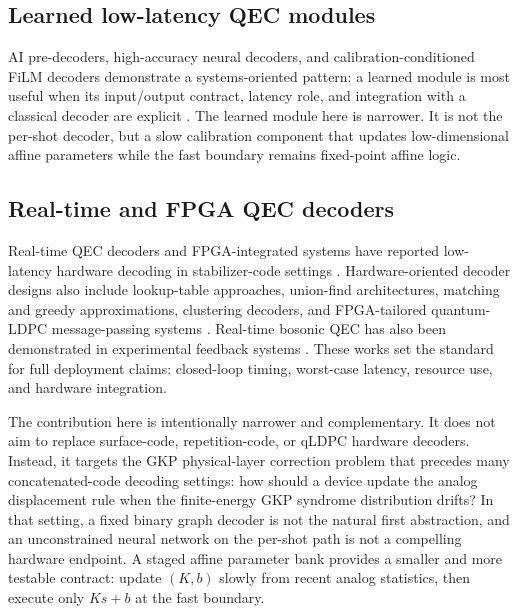 \documentclass[11pt]{article}
\begin{document}
\subsection{Learned low-latency QEC modules}

AI pre-decoders, high-accuracy neural decoders, and calibration-conditioned
FiLM decoders demonstrate a systems-oriented pattern: a learned module is most
useful when its input/output contract, latency role, and integration with a
classical decoder are explicit \cite{chamberland2026,stein2026,
google2023decoder}.  The learned module here is narrower.  It is not the
per-shot decoder, but a slow calibration component that updates
low-dimensional affine parameters while the fast boundary remains fixed-point
affine logic.

\subsection{Real-time and FPGA QEC decoders}

Real-time QEC decoders and FPGA-integrated systems have reported low-latency
hardware decoding in stabilizer-code settings \cite{caune2024,yang2026,
ziad2024,maurer2025}.  Hardware-oriented decoder designs also include
lookup-table approaches, union-find architectures, matching and greedy
approximations, clustering decoders, and FPGA-tailored quantum-LDPC
message-passing systems \cite{lilliput2022,afs2022,helios2023,astrea2023,
collision2025,qldpcfpga2025}.  Real-time bosonic QEC has also been
demonstrated in experimental feedback systems \cite{sivak2023,lachance2024}.
These works set the standard for full deployment claims: closed-loop timing,
worst-case latency, resource use, and hardware integration.

The contribution here is intentionally narrower and complementary.  It does
not aim to replace surface-code, repetition-code, or qLDPC hardware decoders.
Instead, it targets the GKP physical-layer correction problem that precedes
many concatenated-code decoding settings: how should a device update the analog
displacement rule when the finite-energy GKP syndrome distribution drifts?  In
that setting, a fixed binary graph decoder is not the natural first
abstraction, and an unconstrained neural network on the per-shot path is not a
compelling hardware endpoint.  A staged affine parameter bank provides a
smaller and more testable contract: update \((K,b)\) slowly from recent analog
statistics, then execute only \(K s+b\) at the fast boundary.
\end{document}
